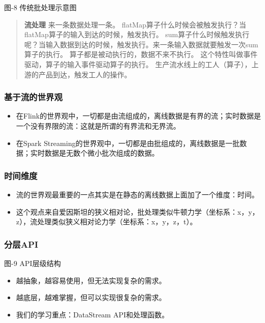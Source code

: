 图-8 传统批处理示意图

\begin{quote}
\textbf{流处理} 来一条数据处理一条。
flatMap算子什么时候会被触发执行？当flatMap算子的输入到达的时候，触发执行。
sum算子什么时候触发执行呢？当输入数据到达的时候，触发执行。来一条输入数据就要触发一次sum算子的执行。
算子都是{被动}执行的，数据不来不执行。
这个特性叫做事件驱动，算子的输入事件驱动算子的执行。
生产流水线上的工人（算子），上游的产品到达，触发工人的操作。
\end{quote}

\hypertarget{ux57faux4e8eux6d41ux7684ux4e16ux754cux89c2}{%
\subsubsection{基于流的世界观}\label{ux57faux4e8eux6d41ux7684ux4e16ux754cux89c2}}

\begin{itemize}
\tightlist
\item
  在Flink的世界观中，一切都是由流组成的，离线数据是有界的流；实时数据是一个没有界限的流：这就是所谓的有界流和无界流。
\item
  在Spark
  Streaming的世界观中，一切都是由批组成的，离线数据是一批数据；实时数据是无数个微小批次组成的数据。
\end{itemize}

\hypertarget{ux65f6ux95f4ux7ef4ux5ea6}{%
\subsubsection{时间维度}\label{ux65f6ux95f4ux7ef4ux5ea6}}

\begin{itemize}
\tightlist
\item
  流的世界观最重要的一点其实是在静态的离线数据上面加了一个维度：时间。
\item
  这个观点来自爱因斯坦的狭义相对论，批处理类似牛顿力学（坐标系：x，y，z），流处理类似狭义相对论力学（坐标系：x，y，z，t）。
\end{itemize}

\hypertarget{ux5206ux5c42api}{%
\subsubsection{分层API}\label{ux5206ux5c42api}}

图-9 API层级结构

\begin{itemize}
\tightlist
\item
  越抽象，越容易使用，但无法实现复杂的需求。
\item
  越底层，越难掌握，但可以实现很复杂的需求。
\item
  我们的学习重点：DataStream API和处理函数。
\end{itemize}

